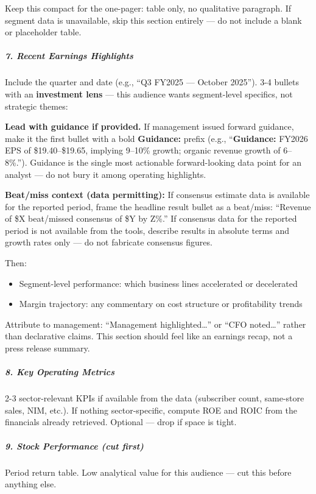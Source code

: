 \documentclass[11pt]{article}
\begin{document}
Keep this compact for the one-pager: table only, no qualitative paragraph. If segment data is unavailable, skip this section entirely — do not include a blank or placeholder table.


\subparagraph{7. Recent Earnings Highlights}\mbox{}\par
Include the quarter and date (e.g., ``Q3 FY2025 — October 2025''). 3-4 bullets with an \textbf{investment lens} — this audience wants segment-level specifics, not strategic themes:


\textbf{Lead with guidance if provided.} If management issued forward guidance, make it the first bullet with a bold \textbf{Guidance:} prefix (e.g., ``\textbf{Guidance:} FY2026 EPS of \$19.40–\$19.65, implying 9–10\% growth; organic revenue growth of 6–8\%.''). Guidance is the single most actionable forward-looking data point for an analyst — do not bury it among operating highlights.


\textbf{Beat/miss context (data permitting):} If consensus estimate data is available for the reported period, frame the headline result bullet as a beat/miss: ``Revenue of \$X beat/missed consensus of \$Y by Z\%.'' If consensus data for the reported period is not available from the tools, describe results in absolute terms and growth rates only — do not fabricate consensus figures.


Then:

\begin{itemize}[leftmargin=*,itemsep=2pt,topsep=2pt]
\item {} Segment-level performance: which business lines accelerated or decelerated
\item {} Margin trajectory: any commentary on cost structure or profitability trends
\end{itemize}

Attribute to management: ``Management highlighted…'' or ``CFO noted…'' rather than declarative claims. This section should feel like an earnings recap, not a press release summary.


\subparagraph{8. Key Operating Metrics}\mbox{}\par
2-3 sector-relevant KPIs if available from the data (subscriber count, same-store sales, NIM, etc.). If nothing sector-specific, compute ROE and ROIC from the financials already retrieved. Optional — drop if space is tight.


\subparagraph{9. Stock Performance (cut first)}\mbox{}\par
Period return table. Low analytical value for this audience — cut this before anything else.
\end{document}
